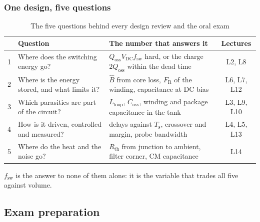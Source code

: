 \begin{frame}
	\frametitle{One design, five questions}
	\begin{table}
		\centering
		\footnotesize
		\begin{tabular}{|c|>{\raggedright\arraybackslash}p{4.6cm}|>{\raggedright\arraybackslash}p{6.4cm}|c|}
			\hline
			  & \textbf{Question}                                & \textbf{The number that answers it}                                                   & \textbf{Lectures} \\
			\hline
			1 & Where does the switching energy go?              & $Q_\mathrm{oss}V_\mathrm{DC}f_\mathrm{sw}$ hard, or the charge $2Q_\mathrm{oss}$ within the dead time & L2, L8      \\
			2 & Where is the energy stored, and what limits it?  & $\hat{B}$ from core loss, $F_\mathrm{R}$ of the winding, capacitance at DC bias        & L6, L7, L12       \\
			3 & Which parasitics are part of the circuit?        & $L_\mathrm{loop}$, $C_\mathrm{oss}$, winding and package capacitance in the tank        & L3, L9, L10       \\
			4 & How is it driven, controlled and measured?       & delays against $T_\mathrm{s}$, crossover and margin, probe bandwidth                  & L4, L5, L13       \\
			5 & Where do the heat and the noise go?              & $R_\mathrm{th}$ from junction to ambient, filter corner, CM capacitance              & L14               \\
			\hline
		\end{tabular}
		\caption{The five questions behind every design review and the oral exam}
	\end{table}
	\small
	$f_\mathrm{sw}$ is the answer to none of them alone: it is the variable that trades all five against volume.
\end{frame}

\subsection{Exam preparation}

